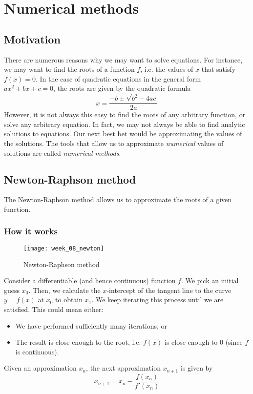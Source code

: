 \chapter{Numerical methods}


\section{Motivation}
There are numerous reasons why we may want to solve equations. For instance, we may want to find the roots of a function $f$, i.e. the values of $x$ that satisfy $f(x) = 0$. In the case of quadratic equations in the general form $ax ^ 2 + bx + c = 0$, the roots are given by the quadratic formula
\[
  x = \frac{-b \pm \sqrt{b ^ 2 - 4ac}}{2a}
\]
However, it is not always this easy to find the roots of any arbitrary function, or solve any arbitrary equation. In fact, we may not always be able to find analytic solutions to equations. Our next best bet would be approximating the values of the solutions. The tools that allow us to approximate \textit{numerical} values of solutions are called \textit{numerical methods}.


\section{Newton-Raphson method}
The Newton-Raphson method allows us to approximate the roots of a given function.


\subsection{How it works}
\begin{figure}[!htbp]
  \centering
  \texttt{[image: week\_08\_newton]}
  \caption{Newton-Raphson method}
\end{figure}
Consider a differentiable (and hence continuous) function $f$. We pick an initial guess $x_0$. Then, we calculate the $x$-intercept of the tangent line to the curve $y = f(x)$ at $x_0$ to obtain $x_1$. We keep iterating this process until we are satisfied. This could mean either:
\begin{itemize}
  \item We have performed sufficiently many iterations, or
  \item The result is close enough to the root, i.e. $f(x)$ is close enough to $0$ (since $f$ is continuous).
\end{itemize}
\begin{definition}
  \label{def:newton-raphson}
  Given an approximation $x_n$, the next approximation $x_{n + 1}$ is given by
  \[
    x_{n + 1} = x_n - \frac{f(x_n)}{f'(x_n)}
  \]
\end{definition}

